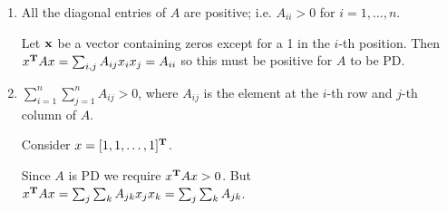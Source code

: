 \begin{enumerate}[label=(\alph*)]
\begin{enumerate}[label=(\roman*)]
\begin{mdframed}
          \end{mdframed}
        \item All the diagonal entries of $A$ are positive; i.e. $A_{ii} > 0$
          for $i = 1, \ldots, n$.
          \begin{mdframed}
            Let $\mathbf{x}$ be a vector containing zeros except for a 1 in the $i$-th
            position. Then $x^{\mathbf{T}} A x = \sum_{i,j} A_{ij}x_ix_j = A_{ii}$ so
            this must be positive for $A$ to be PD.
          \end{mdframed}
        \item $\sum_{i=1}^n \sum_{j=1}^n A_{ij} > 0$, where $A_{ij}$ is the
          element at the $i$-th row and $j$-th column of $A$.
          \begin{mdframed}
            Consider $x = [1, 1, \ldots, 1]^{\mathbf{T}}$.

            Since $A$ is PD we require $x^{\mathbf{T}} Ax > 0$. But
            $x^{\mathbf{T}} Ax = \sum_j \sum_k A_{jk}x_jx_k = \sum_j \sum_k A_{jk}$.
          \end{mdframed}
    \end{enumerate}
\end{enumerate}

\newpage
